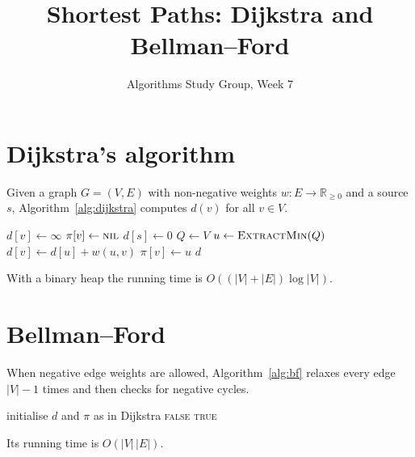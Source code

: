 \documentclass{article}
\title{Shortest Paths: Dijkstra and Bellman--Ford}
\author{Algorithms Study Group, Week 7}
\date{}
\begin{document}
\maketitle

\section{Dijkstra's algorithm}
Given a graph $G=(V,E)$ with non-negative weights $w\colon E\to\mathbb{R}_{\ge 0}$
and a source $s$, Algorithm~\ref{alg:dijkstra} computes $d(v)$ for all $v\in V$.

\begin{algorithm}
\caption{Dijkstra's algorithm}
\label{alg:dijkstra}
\begin{algorithmic}[1]
    \State $d[v] \gets \infty$
    \State $\pi[v] \gets \textsc{nil}$
  \EndFor
  \State $d[s] \gets 0$
  \State $Q \gets V$ 
    \State $u \gets \Call{ExtractMin}{Q}$
        \State $d[v] \gets d[u] + w(u,v)$
        \State $\pi[v] \gets u$
      \EndIf
    \EndFor
  \EndWhile
  \State \Return $d$
\EndProcedure
\end{algorithmic}
\end{algorithm}

With a binary heap the running time is $O((|V|+|E|)\log|V|)$.

\section{Bellman--Ford}
When negative edge weights are allowed, Algorithm~\ref{alg:bf} relaxes every edge
$|V|-1$ times and then checks for negative cycles.

\begin{algorithm}
\caption{Bellman--Ford}
\label{alg:bf}
\begin{algorithmic}[1]
  \State initialise $d$ and $\pi$ as in Dijkstra
      \State {}
    \EndFor
  \EndFor
      \State \Return \textsc{false}
    \EndIf
  \EndFor
  \State \Return \textsc{true}
\EndFunction
\end{algorithmic}
\end{algorithm}

Its running time is $O(|V|\,|E|)$.
\end{document}
